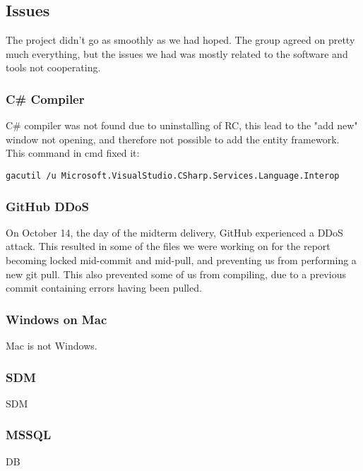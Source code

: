 \subsection{Issues}
The project didn't go as smoothly as we had hoped. The group agreed on pretty much everything, but the issues we had was mostly related to the software and tools not cooperating.

\subsubsection{C\# Compiler}
C\# compiler was not found due to uninstallìng of RC, this lead to the "add new" window not opening, and therefore not possible to add the entity framework.\\
This command in cmd fixed it:
\begin{verbatim}
gacutil /u Microsoft.VisualStudio.CSharp.Services.Language.Interop 
\end{verbatim}

\subsubsection{GitHub DDoS}
On October 14, the day of the midterm delivery, GitHub experienced a DDoS attack. This resulted in some of the files we were working on for the report becoming locked mid-commit and mid-pull, and preventing us from performing a new git pull. This also prevented some of us from compiling, due to a previous commit containing errors having been pulled.

\subsubsection{Windows on Mac}
Mac is not Windows.

\subsubsection{SDM}
SDM

\subsubsection{MSSQL}
DB



